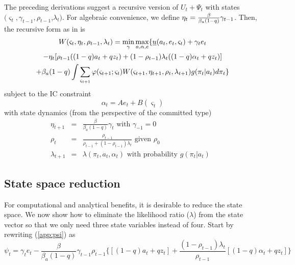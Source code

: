 \documentclass[12pt,letter,leqno]{article}
\theoremstyle{asn}
\theoremstyle{lem}
\theoremstyle{slem}
\theoremstyle{prop}
\theoremstyle{appprop}
\theoremstyle{rem}
\theoremstyle{defn}
\begin{document}
The preceding derivations suggest a recursive version of $U_t + \Psi_t$ with states $(\varsigma _{t},\gamma _{t-1},\rho _{t-1}$,$\lambda _{t})$. For algebraic convenience, we define $\eta _{t}=\frac{\beta }{%
\beta_{a}(1-q)}\gamma _{t-1}$. Then, the recursive form as in \cite{marcet_recursive_2019} is
\begin{multline}
W(\varsigma _{t},\eta _{t},\rho _{t-1},\lambda _{t}) =
\min_{\gamma
}\max_{a,\alpha ,e}\{ \uline{u}(a_{t},e_{t},\varsigma _{t})+\gamma_{t}e_{t}  \\
-\eta_{t} [\rho
_{t-1}((1-q)a_{t}+qz_{t})+(1-\rho _{t-1})\lambda _{t}((1-q)\alpha
_{t}+qz_{t})] \\
+\beta_{a}(1-q)\int \sum_{\varsigma _{t+1}}\varphi (\varsigma
_{t+1};\varsigma _{t})W(\varsigma _{t+1},\eta _{t+1},\rho _{t},\lambda
_{t+1})g(\pi_t|a_{t})d\pi_t \}  \label{W recursion}
\end{multline}
subject to the IC constraint 
\begin{equation*}
\alpha _{t}=Ae_{t}+B(\varsigma _{t})
\end{equation*}%
with state dynamics (from the perspective of the committed type) 
\begin{eqnarray*}
\eta _{t+1} &=&\frac{\beta }{\beta_{a}(1-q)}\gamma _{t} \text{ with } \gamma_{-1}=0 \\
\rho _{t} &=&\frac{\rho _{t-1}}{\rho _{t-1}+(1-\rho _{t-1})\lambda _{t}} \text{ given } \rho_{0}\\
\lambda _{t+1} &=&\lambda (\pi_t ,a_t,\alpha_t )\text{ with probability } g(\pi_t |a_t)%
\text{ }
\end{eqnarray*}


\subsection{State space reduction} \label{appsec:recursive9}
For computational and analytical benefits, it is desirable to reduce the state space. We now show how to eliminate the likelihood ratio ($\lambda$) from the state vector so that we only need three state variables instead of four.
Start by rewriting (\ref{app:psi}) as 
\begin{equation}
\psi _{t}=\gamma_t e_t -\frac{\beta }{\beta_{a}(1-q)}\gamma _{t-1}\rho
_{t-1}\{[(1-q)a_{t}+qz_{t}]+\frac{(1-\rho _{t-1})\lambda _{t}}{\rho _{t-1}}%
[(1-q)\alpha _{t}+qz_{t}]\}
\end{equation}
\end{document}
